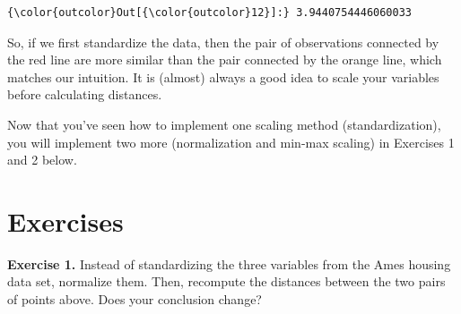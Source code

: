 \documentclass[11pt]{article}
\begin{document}
\begin{Verbatim}[commandchars=\\\{\}]
{\color{outcolor}Out[{\color{outcolor}12}]:} 3.9440754446060033
\end{Verbatim}
            
    So, if we first standardize the data, then the pair of observations
connected by the red line are more similar than the pair connected by
the orange line, which matches our intuition. It is (almost) always a
good idea to scale your variables before calculating distances.

Now that you've seen how to implement one scaling method
(standardization), you will implement two more (normalization and
min-max scaling) in Exercises 1 and 2 below.

    \hypertarget{exercises}{%
\section{Exercises}\label{exercises}}

    \textbf{Exercise 1.} Instead of standardizing the three variables from
the Ames housing data set, normalize them. Then, recompute the distances
between the two pairs of points above. Does your conclusion change?
\end{document}
